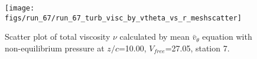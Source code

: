 \begin{figure}[H]
\centering
\texttt{[image: figs/run\_67/run\_67\_turb\_visc\_by\_vtheta\_vs\_r\_meshscatter]}
\caption{Scatter plot of total viscosity $\nu$ calculated by mean $\bar{v}_{\theta}$ equation with non-equilibrium pressure at $z/c$=10.00, $V_{free}$=27.05, station 7.}
\label{fig:run_67_turb_visc_by_vtheta_vs_r_meshscatter}
\end{figure}


